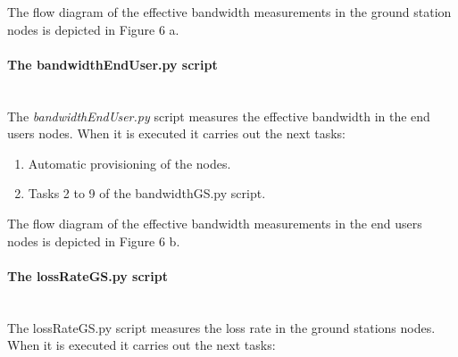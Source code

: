 The flow diagram of the effective bandwidth measurements in the ground station nodes is depicted in Figure 6 a.

\paragraph{The bandwidthEndUser.py script}~\\

The \emph{bandwidthEndUser.py} script measures the effective bandwidth in the
end users nodes. When it is executed it carries out the next tasks:
\begin{enumerate}
\item Automatic provisioning of the nodes.
\item Tasks 2 to 9 of the bandwidthGS.py script.
\end{enumerate}

The flow diagram of the effective bandwidth measurements in the end users nodes is depicted in Figure 6 b.

\paragraph{The lossRateGS.py script}~\\

The lossRateGS.py  script measures the loss rate in the ground stations
nodes. When it is executed it carries out the next tasks:

